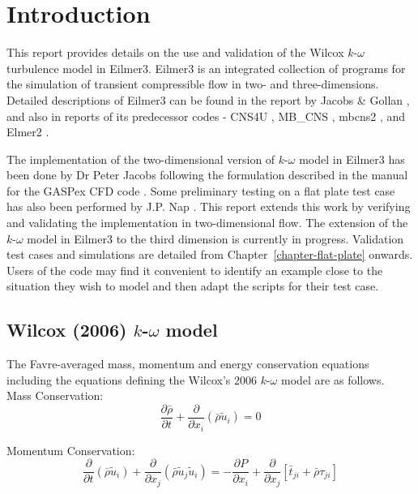 
\newpage
\section{Introduction}
\label{chapter-introduction}
%
This report provides details on the use and validation of the Wilcox \cite{Wilcox2006}
$k$-$\omega$ turbulence model in Eilmer3. Eilmer3 is an integrated
collection of programs for the simulation of transient compressible flow
in two- and three-dimensions. Detailed descriptions of Eilmer3 can be 
found in the report by Jacobs \& Gollan \cite{Jacobs2008,Jacobs2010}, and also in reports of its
predecessor codes - CNS4U \cite{Jacobs1991}, MB\_CNS \cite{Jacobs1996}, mbcns2 \cite{Jacobs2006},
and Elmer2 \cite{Jacobs2007}. 

The implementation of the two-dimensional version of $k$-$\omega$ model in Eilmer3 has 
been done by Dr Peter Jacobs following the formulation described in the manual for
the GASPex CFD code \cite{AeroSoft2009}. Some preliminary testing on a flat plate test 
case has also been performed by J.P. Nap \cite{Nap2007}. This report extends this work 
by verifying and validating the implementation in two-dimensional flow. The extension of the 
$k$-$\omega$ model in Eilmer3 to the third dimension is currently in progress. Validation 
test cases and simulations are detailed from Chapter~\ref{chapter-flat-plate} onwards. 
Users of the code may find it convenient to identify an example close to the situation 
they wish to model and then adapt the scripts for their test case.

\subsection{Wilcox (2006) $k$-$\omega$ model}
%
The Favre-averaged mass, momentum and energy conservation equations including
the equations defining the Wilcox's 2006 $k$-$\omega$ model are as follows. \\

Mass Conservation:
\begin{equation}
\frac{\partial \bar{\rho}}{\partial t} + \frac{\partial}{\partial x_i} 
\left( \bar{\rho} \tilde{u}_i \right) = 0
\end{equation}

Momentum Conservation:
\begin{equation}
\frac{\partial}{\partial t} \left( \bar{\rho} \tilde{u}_i \right) +
\frac{\partial}{\partial x_j} \left( \bar{\rho} \tilde{u}_j \tilde{u}_i \right) =
- \frac{\partial P}{\partial x_i} + \frac{\partial}{\partial x_j} \left[ 
\bar{t}_{ji} + \bar{\rho} \tau_{ji} \right]
\end{equation}

